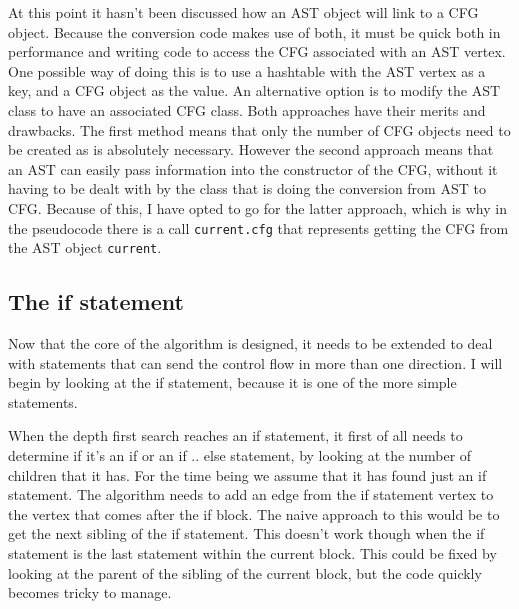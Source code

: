 At this point it hasn't been discussed how an AST object will link to a CFG object. Because the conversion code makes use of both, it must be quick both in performance and writing code to access the CFG associated with an AST vertex. One possible way of doing this is to use a hashtable with the AST vertex as a key, and a CFG object as the value. An alternative option is to modify the AST class to have an associated CFG class. Both approaches have their merits and drawbacks. The first method means that only the number of CFG objects need to be created as is absolutely necessary. However the second approach means that an AST can easily pass information into the constructor of the CFG, without it having to be dealt with by the class that is doing the conversion from AST to CFG. Because of this, I have opted to go for the latter approach, which is why in the pseudocode there is a call \verb|current.cfg| that represents getting the CFG from the AST object \verb|current|.

\subsection{The if statement}

Now that the core of the algorithm is designed, it needs to be extended to deal with statements that can send the control flow in more than one direction. I will begin by looking at the if statement, because it is one of the more simple statements.

When the depth first search reaches an if statement, it first of all needs to determine if it's an if or an if .. else statement, by looking at the number of children that it has. For the time being we assume that it has found just an if statement. The algorithm needs to add an edge from the if statement vertex to the vertex that comes after the if block. The naive approach to this would be to get the next sibling of the if statement. This doesn't work though when the if statement is the last statement within the current block. This could be fixed by looking at the parent of the sibling of the current block, but the code quickly becomes tricky to manage.

